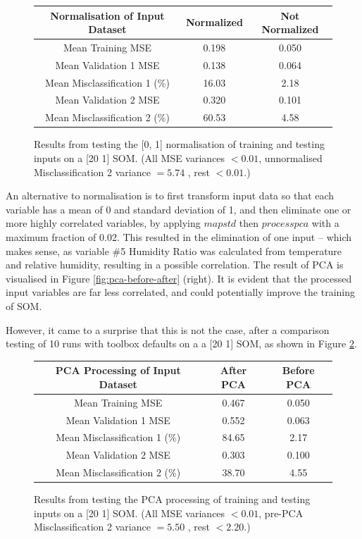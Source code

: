 \documentclass[10pt, oneside]{article}
\begin{document}
\begin{figure}[h]
\begin{center}
\fontsize{9}{11}\selectfont
\begin{tabular}{|c|c|c|}
\hline 
Normalisation of Input Dataset & Normalized & Not Normalized \\ \hline
Mean Training MSE & 0.198 & 0.050 \\ \hline \hline 
Mean Validation 1 MSE & 0.138 & 0.064 \\ \hline 
Mean Misclassification 1 (\%) & 16.03 & 2.18 \\ \hline \hline 
Mean Validation 2 MSE & 0.320 & 0.101 \\ \hline 
Mean Misclassification 2 (\%) & 60.53 & 4.58 \\ \hline
\end{tabular}
\end{center}
\caption{\label{fig:normalize-testing} Results from testing the [0, 1] normalisation of training and testing inputs on a [20 1] SOM. (All MSE variances $<0.01$, unnormalised Misclassification 2 variance $=5.74$ , rest $<0.01$.)}
\end{figure}

An alternative to normalisation is to first transform input data so that each variable has a mean of 0 and standard deviation of 1, and then eliminate one or more highly correlated variables, by applying $mapstd$ then $processpca$ with a maximum fraction of 0.02. This resulted in the elimination of one input -- which makes sense, as variable \#5 Humidity Ratio was calculated from temperature and relative humidity, resulting in a possible correlation. The result of PCA is visualised in Figure \ref{fig:pca-before-after} (right). It is evident that the processed input variables are far less correlated, and could potentially improve the training of SOM.

However, it came to a surprise that this is not the case, after a comparison testing of 10 runs with toolbox defaults on a a [20 1] SOM, as shown in Figure \ref{fig:pca-testing}.

\begin{figure}[h]
\begin{center}
\fontsize{9}{11}\selectfont
\begin{tabular}{|c|c|c|}
\hline 
PCA Processing of Input Dataset & After PCA & Before PCA \\ \hline
Mean Training MSE & 0.467 & 0.050 \\ \hline \hline 
Mean Validation 1 MSE & 0.552 & 0.063 \\ \hline 
Mean Misclassification 1 (\%) & 84.65 & 2.17 \\ \hline \hline 
Mean Validation 2 MSE & 0.303 & 0.100 \\ \hline 
Mean Misclassification 2 (\%) & 38.70 & 4.55 \\ \hline
\end{tabular}
\end{center}
\caption{\label{fig:pca-testing} Results from testing the PCA processing of training and testing inputs on a [20 1] SOM. (All MSE variances $<0.01$, pre-PCA Misclassification 2 variance $=5.50$ , rest $<2.20$.)}
\end{figure}
\end{document}
